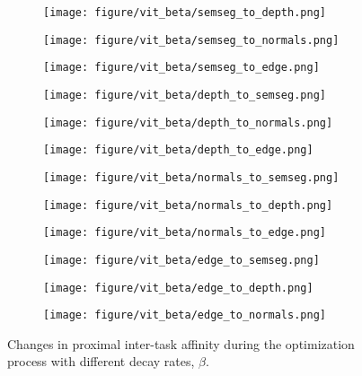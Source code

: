 \begin{figure}[h]
    \centering
    \begin{subfigure}{0.24\textwidth}
        \texttt{[image: figure/vit\_beta/semseg\_to\_depth.png]}
    \end{subfigure}
    \begin{subfigure}{0.24\textwidth}
        \texttt{[image: figure/vit\_beta/semseg\_to\_normals.png]}
    \end{subfigure}
    \begin{subfigure}{0.24\textwidth}
        \texttt{[image: figure/vit\_beta/semseg\_to\_edge.png]}
    \end{subfigure}
    \begin{subfigure}{0.24\textwidth}
        \texttt{[image: figure/vit\_beta/depth\_to\_semseg.png]}
    \end{subfigure}
    \hfill
    \begin{subfigure}{0.24\textwidth}
        \texttt{[image: figure/vit\_beta/depth\_to\_normals.png]}
    \end{subfigure}
    \begin{subfigure}{0.24\textwidth}
        \texttt{[image: figure/vit\_beta/depth\_to\_edge.png]}
    \end{subfigure}
    \begin{subfigure}{0.24\textwidth}
        \texttt{[image: figure/vit\_beta/normals\_to\_semseg.png]}
    \end{subfigure}
    \begin{subfigure}{0.24\textwidth}
        \texttt{[image: figure/vit\_beta/normals\_to\_depth.png]}
    \end{subfigure}
    \hfill
    \begin{subfigure}{0.24\textwidth}
        \texttt{[image: figure/vit\_beta/normals\_to\_edge.png]}
    \end{subfigure}
    \begin{subfigure}{0.24\textwidth}
        \texttt{[image: figure/vit\_beta/edge\_to\_semseg.png]}
    \end{subfigure}
    \begin{subfigure}{0.24\textwidth}
        \texttt{[image: figure/vit\_beta/edge\_to\_depth.png]}
    \end{subfigure}
    \begin{subfigure}{0.24\textwidth}
        \texttt{[image: figure/vit\_beta/edge\_to\_normals.png]}
    \end{subfigure}
    \caption{Changes in proximal inter-task affinity during the optimization process with different decay rates, $\beta$.}
    \label{fig:proximal_vit_beta}
\end{figure}



